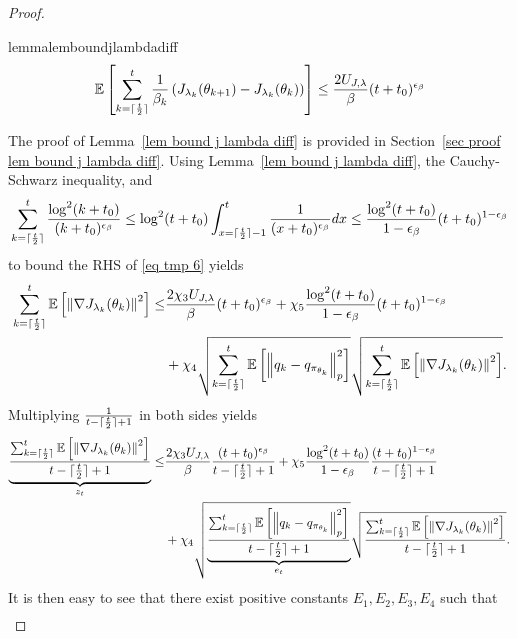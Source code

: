 \documentclass[twoside,11pt]{article}
\DeclarePairedDelimiter{\ceil}{\lceil}{\rceil}
\newcommand{\E}{\mathbb{E}}
\numberwithin{assucounter}{section}
\begin{document}
\begin{proof}
\begin{restatable}{lemma}{lemboundjlambdadiff}
  \label{lem bound j lambda diff}
  \begin{align}
  \E\left[\sum_{k=\ceil{\frac{t}{2}}}^t \frac{1}{\beta_k}\left(J_{\lambda_k}(\theta_{k+1}) - J_{\lambda_k}(\theta_k) \right) \right]\leq \frac{2U_{J, \lambda}}{\beta} (t+t_0)^{\epsilon_\beta}
  \end{align}
\end{restatable}
\noindent The proof of Lemma~\ref{lem bound j lambda diff} is provided in Section~\ref{sec proof lem bound j lambda diff}.
Using Lemma~\ref{lem bound j lambda diff},
the Cauchy-Schwarz inequality,
and 
\begin{align}
  \sum_{k=\ceil{\frac{t}{2}}}^t \frac{\log^2(k+t_0)}{(k+t_0)^{\epsilon_\beta}} \leq \log^2(t+t_0) \int_{x=\ceil{\frac{t}{2}}-1}^t \frac{1}{(x+t_0)^{\epsilon_\beta}} dx \leq  \frac{\log^2(t+t_0)}{1-\epsilon_\beta} (t+t_0)^{1-\epsilon_\beta}
\end{align}
to bound the RHS of \eqref{eq tmp 6} yields
\begin{align}
  \sum_{k=\ceil{\frac{t}{2}}}^t \E\left[\norm{ \nabla J_{\lambda_k}(\theta_k)}^2\right] \leq& \frac{2\chi_3 U_{J, \lambda}}{\beta} (t+t_0)^{\epsilon_\beta}  + \chi_5 \frac{\log^2(t+t_0)}{1-\epsilon_\beta} (t+t_0)^{1-\epsilon_\beta}\\
  &+ \chi_4 \sqrt{\sum_{k=\ceil{\frac{t}{2}}}^t \E\left[\norm{q_k - q_{\pi_{\theta_k}}}_p^2 \right]} \sqrt{\sum_{k=\ceil{\frac{t}{2}}}^t \E\left[\norm{\nabla J_{\lambda_k}(\theta_k)}^2\right]}.
\end{align}
Multiplying $\frac{1}{t-\ceil{\frac{t}{2}}+1}$ in both sides yields
\begin{align}
  \underbrace{\frac{\sum_{k=\ceil{\frac{t}{2}}}^t \E\left[\norm{ \nabla J_{\lambda_k}(\theta_k)}^2\right]}{t-\ceil{\frac{t}{2}}+1}}_{z_t} \leq& \frac{2\chi_3 U_{J, \lambda}}{\beta} \frac{(t+t_0)^{\epsilon_\beta}}{t - \ceil{\frac{t}{2}} + 1} + \chi_5 \frac{\log^2(t+t_0)}{1-\epsilon_\beta} \frac{(t+t_0)^{1-\epsilon_\beta}}{t - \ceil{\frac{t}{2}} + 1}\\
  &+ \chi_4 \sqrt{\underbrace{\frac{\sum_{k=\ceil{\frac{t}{2}}}^t \E\left[\norm{q_k - q_{\pi_{\theta_k}}}_p^2 \right]}{t-\ceil{\frac{t}{2}}+1}}_{e_t}} \sqrt{\frac{\sum_{k=\ceil{\frac{t}{2}}}^t \E\left[\norm{\nabla J_{\lambda_k}(\theta_k)}^2\right]}{t-\ceil{\frac{t}{2}}+1}}.
\end{align}
It is then easy to see that there exist positive constants $E_1, E_2, E_3, E_4$ such that
\begin{align}

\end{align}
\end{proof}
\end{document}

